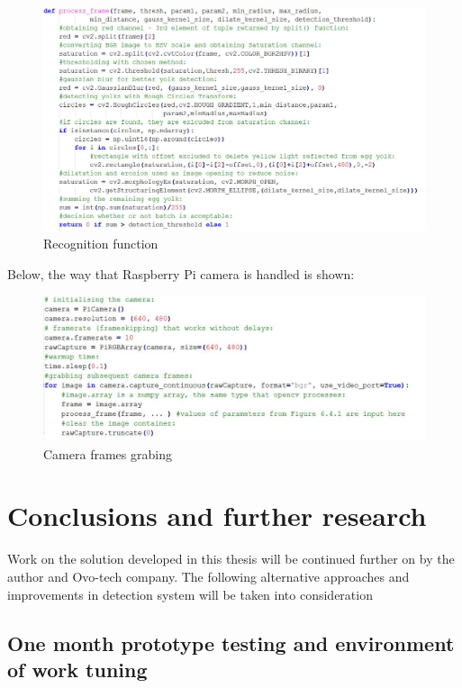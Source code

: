 \documentclass[12pt,twoside,a4paper]{article}
\begin{document}
\begin{figure}[H]
\centering
\includegraphics[width=0.8\paperwidth]{curcial}
\caption{Recognition function}\label{fig:crucial}
\end{figure}

Below, the way that Raspberry Pi camera is handled is shown:

\begin{figure}[H]
\centering
\includegraphics[width=0.8\paperwidth]{rpicode}
\caption{Camera frames grabing}\label{fig:rpicode}
\end{figure}
\section{Conclusions and further research}

Work on the solution developed in this thesis will be continued further on by the author and Ovo-tech company.
The following alternative approaches and improvements in detection system will be taken into consideration

\subsection{One month prototype testing and environment of work tuning}
\end{document}
